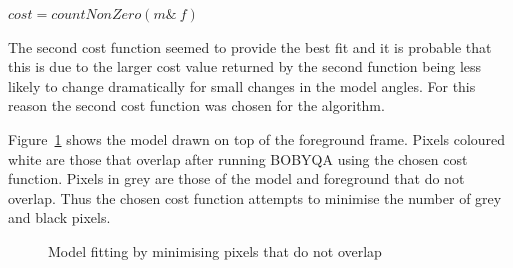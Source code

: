 \centerline{$cost = countNonZero(m \& ~f)$}

The second cost function seemed to provide the best fit and it is probable that this is due to the larger cost value returned by the second function being less likely to change dramatically for small changes in the model angles. For this reason the second cost function was chosen for the algorithm.

Figure~\ref{fig:modeloverlap} shows the model drawn on top of the foreground frame. Pixels coloured white are those that overlap after running BOBYQA using the chosen cost function. Pixels in grey are those of the model and foreground that do not overlap. Thus the chosen cost function attempts to minimise the number of grey and black pixels.

\begin{figure}[H]
    \centering
\caption{Model fitting by minimising pixels that do not overlap}
\label{fig:modeloverlap}
\end{figure}

